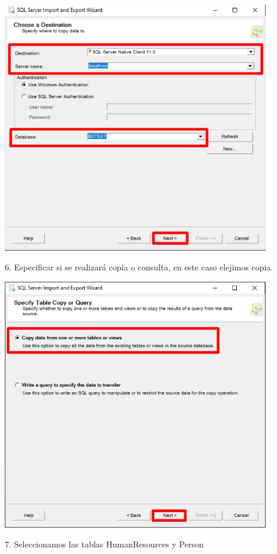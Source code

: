 \documentclass[12pt,letterpaper]{article}
\begin{document}
	\begin{center}
	\includegraphics[width=11.5cm]{./img/5}
	\end{center}	
6. Especificar si se realizará copia o consulta, en este caso elejimos copia.
	\begin{center}
	\includegraphics[width=11.5cm]{./img/6}
	\end{center}	
7. Seleccionamos las tablas HumanResources y Person
\end{document}
